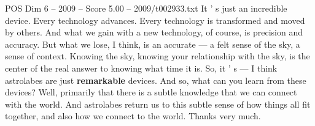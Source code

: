 \begin{textsample}{POS Dim 6 – 2009 – Score 5.00 – 2009/t002933.txt}
It ' s just an incredible device.
Every technology advances.
Every technology is transformed and moved by others.
And what we gain with a new technology, of course, is precision and accuracy.
But what we lose, I think, is an accurate — a felt sense of the sky, a sense of context.
Knowing the sky, knowing your relationship with the sky, is the center of the real answer to knowing what time it is.
So, it ' s — I think astrolabes are just \textbf{remarkable} devices.
And so, what can you learn from these devices?
Well, primarily that there is a subtle knowledge that we can connect with the world.
And astrolabes return us to this subtle sense of how things all fit together, and also how we connect to the world.
Thanks very much.

\end{textsample}
